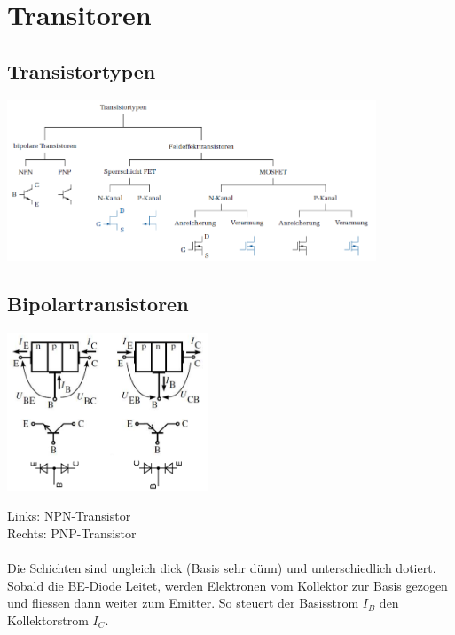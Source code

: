 \section{Transitoren}
	\subsection{Transistortypen}
	\includegraphics[width=11cm]{images/Transistortypen.png}

\subsection{Bipolartransistoren}
	\begin{minipage}[c]{6cm}
		\includegraphics[width=6cm]{images/bipolarTransistor-Aufbau}
	\end{minipage}
	\begin{minipage}[c]{12cm}
		Links: NPN-Transistor \\
		Rechts: PNP-Transistor \\
		\\
		Die Schichten sind ungleich dick (Basis sehr dünn) und unterschiedlich dotiert.
		Sobald die BE-Diode Leitet, werden Elektronen vom Kollektor zur Basis gezogen und
		fliessen dann weiter zum Emitter. So steuert der Basisstrom $I_B$ den 
		Kollektorstrom $I_C$. \\
	\end{minipage} \\
	
